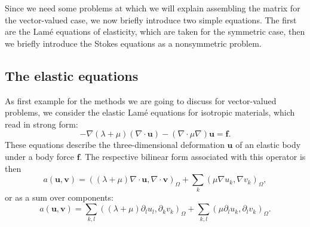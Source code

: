 \documentclass{article}
\renewcommand{\div}{\nabla\cdot}
\renewcommand{\vec}[1]{{\mathbf #1}}
\begin{document}
Since we need some problems at which we will explain assembling the matrix for
the vector-valued case, we now briefly introduce two simple equations. The
first are the Lam\'e equations of elasticity, which are taken for the symmetric
case, then we briefly introduce the Stokes equations as a nonsymmetric problem.

\subsection{The elastic equations}
\label{sec:elastic}

As first example for the methods we are going to discuss for vector-valued
problems, we consider the elastic Lam\'e equations for isotropic materials,
which read in strong form:
$$
   -
   \nabla (\lambda+\mu) (\div \vec u)
   -
   (\nabla \cdot \mu \nabla) \vec u
   =
   \vec f.
$$
These equations describe the three-dimensional deformation $\vec u$ of an
elastic body under a body force $\vec f$. The respective bilinear form
associated with this operator is then
$$
  a(\vec u, \vec v) =
  \left(
    (\lambda+\mu) \div \vec u, \div \vec v
  \right)_\Omega
  +
  \sum_k
  \left(
    \mu \nabla u_k, \nabla v_k
  \right)_\Omega,
$$
or as a sum over components:
$$
  a(\vec u, \vec v) =
  \sum_{k,l}
  \left(
    (\lambda+\mu) \partial_l u_l, \partial_k v_k
  \right)_\Omega
  +
  \sum_{k,l}
  \left(
    \mu \partial_l u_k, \partial_l v_k
  \right)_\Omega.
$$
\end{document}
